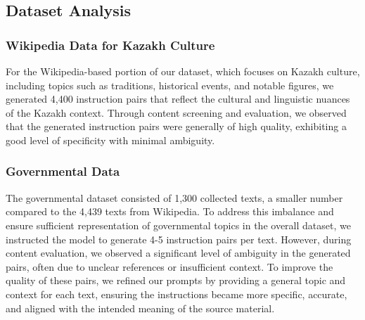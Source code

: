 \begin{table}[ht]
\centering
\renewcommand{\arraystretch}{1.3} %
\caption{Statistics on Wikipedia and Governmental Data for Instruction Pair Generation}
\label{tab:statistics_wikipedia_governmental}
\end{table}


\subsection{Dataset Analysis}
\subsubsection{Wikipedia Data for Kazakh Culture}
For the Wikipedia-based portion of our dataset, which focuses on Kazakh culture, including topics such as traditions, historical events, and notable figures, we generated 4,400 instruction pairs that reflect the cultural and linguistic nuances of the Kazakh context. Through content screening and evaluation, we observed that the generated instruction pairs were generally of high quality, exhibiting a good level of specificity with minimal ambiguity.

\subsubsection{Governmental Data}
The governmental dataset consisted of 1,300 collected texts, a smaller number compared to the 4,439 texts from Wikipedia. To address this imbalance and ensure sufficient representation of governmental topics in the overall dataset, we instructed the model to generate 4-5 instruction pairs per text. However, during content evaluation, we observed a significant level of ambiguity in the generated pairs, often due to unclear references or insufficient context. To improve the quality of these pairs, we refined our prompts by providing a general topic and context for each text, ensuring the instructions became more specific, accurate, and aligned with the intended meaning of the source material.

